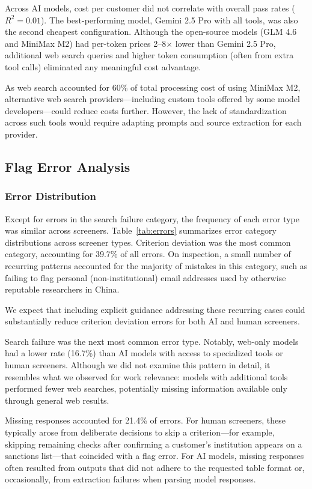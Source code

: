 \documentclass[utf8]{FrontiersinHarvard}
\begin{document}
Across AI models, cost per customer did not correlate with overall pass rates ($R^2 = 0.01$). The best-performing model, Gemini 2.5 Pro with all tools, was also the second cheapest configuration. Although the open-source models (GLM 4.6 and MiniMax M2) had per-token prices 2--8$\times$ lower than Gemini 2.5 Pro, additional web search queries and higher token consumption (often from extra tool calls) eliminated any meaningful cost advantage.

As web search accounted for 60\% of total processing cost of using MiniMax M2, alternative web search providers—including custom tools offered by some model developers—could reduce costs further. However, the lack of standardization across such tools would require adapting prompts and source extraction for each provider.

\subsection{Flag Error Analysis}

\subsubsection{Error Distribution}

Except for errors in the search failure category, the frequency of each error type was similar across screeners. Table~\ref{tab:errors} summarizes error category distributions across screener types. Criterion deviation was the most common category, accounting for 39.7\% of all errors. On inspection, a small number of recurring patterns accounted for the majority of mistakes in this category, such as failing to flag personal (non-institutional) email addresses used by otherwise reputable researchers in China.

We expect that including explicit guidance addressing these recurring cases could substantially reduce criterion deviation errors for both AI and human screeners.

Search failure was the next most common error type. Notably, web-only models had a lower rate (16.7\%) than AI models with access to specialized tools or human screeners. Although we did not examine this pattern in detail, it resembles what we observed for work relevance: models with additional tools performed fewer web searches, potentially missing information available only through general web results.

Missing responses accounted for 21.4\% of errors. For human screeners, these typically arose from deliberate decisions to skip a criterion—for example, skipping remaining checks after confirming a customer's institution appears on a sanctions list—that coincided with a flag error. For AI models, missing responses often resulted from outputs that did not adhere to the requested table format or, occasionally, from extraction failures when parsing model responses.
\end{document}
